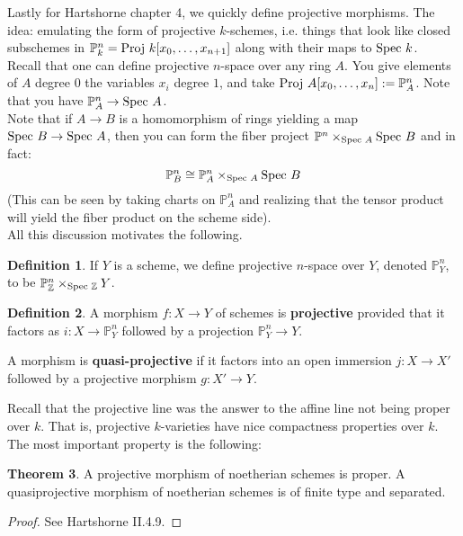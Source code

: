 \documentclass[10pt,reqno]{amsart}
\theoremstyle{definition}
\newtheorem{theorem}{Theorem}
\newtheorem{definition}[theorem]{Definition}
\theoremstyle{remark}
\numberwithin{equation}{section}
\numberwithin{theorem}{section}
\newcommand{\Z}{{\mathbb Z}}
\newcommand{\spec}{\textup{Spec }}
\newcommand{\PP}{{\mathbb P}}
\begin{document}
Lastly for Hartshorne chapter 4, we quickly define projective morphisms. The idea: emulating the form of projective $k$-schemes, i.e. things that look like closed subschemes in $\PP^n_k = \textup{Proj } k[x_0,\dots,x_{n+1}]$ along with their maps to $\spec k$.
\\

Recall that one can define projective $n$-space over any ring $A$. You give elements of $A$ degree $0$ the variables $x_i$ degree $1$, and take $\textup{Proj }A[x_0,\dots,x_n] := \PP^n_A$. Note that you have $\PP^n_A \to \spec A$.
\\

Note that if $A \to B$ is a homomorphism of rings yielding a map $\spec B \to \spec A$, then you can form the fiber project $\PP^n \times_{\spec A} \spec B$ and in fact:
\[\PP^n_B \cong \PP^n_A \times_{\spec A} \spec B\]
(This can be seen by taking charts on $\PP^n_A$ and realizing that the tensor product will yield the fiber product on the scheme side).
\\

All this discussion motivates the following.

\begin{definition} If $Y$ is a scheme, we define projective $n$-space over $Y$, denoted $\PP^n_Y$, to be $\PP^n_{\Z} \times_{\spec \Z} Y$. 
\end{definition}

\begin{definition} A morphism $f: X \to Y$ of schemes is \textbf{projective} provided that it factors as $i: X \to \PP^n_Y$ followed by a projection $\PP^n_Y \to Y$. 

A morphism is \textbf{quasi-projective} if it factors into an open immersion $j: X \to X'$ followed by a projective morphism $g: X' \to Y$. 
\end{definition}

Recall that the projective line was the answer to the affine line not being proper over $k$. That is, projective $k$-varieties have nice compactness properties over $k$. The most important property is the following:

\begin{theorem} A projective morphism of noetherian schemes is proper. A quasiprojective morphism of noetherian schemes is of finite type and separated.
\end{theorem}
\begin{proof}
See Hartshorne II.4.9.
\end{proof}
\end{document}
